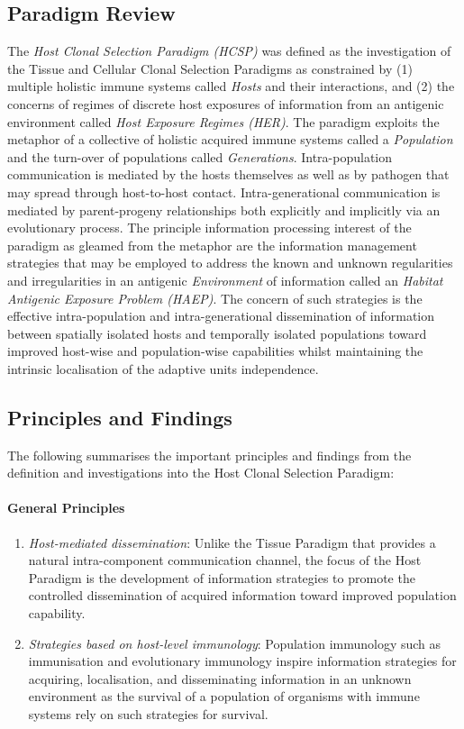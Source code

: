 \subsection{Paradigm Review}
The \emph{Host Clonal Selection Paradigm (HCSP)} was defined as the investigation of the Tissue and Cellular Clonal Selection Paradigms as constrained by (1) multiple holistic immune systems called \emph{Hosts} and their interactions, and (2) the concerns of regimes of discrete host exposures of information from an antigenic environment called \emph{Host Exposure Regimes (HER)}.
The paradigm exploits the metaphor of a collective of holistic acquired immune systems called a \emph{Population} and the turn-over of populations called \emph{Generations}. Intra-population communication is mediated by the hosts themselves as well as by pathogen that may spread through host-to-host contact. Intra-generational communication is mediated by parent-progeny relationships both explicitly and implicitly via an evolutionary process.
The principle information processing interest of the paradigm as gleamed from the metaphor are the information management strategies that may be employed to address the known and unknown regularities and irregularities in an antigenic \emph{Environment} of information called an \emph{Habitat Antigenic Exposure Problem (HAEP)}. The concern of such strategies is the effective intra-population and intra-generational dissemination of information between spatially isolated hosts and temporally isolated populations toward improved host-wise and population-wise capabilities whilst maintaining the intrinsic localisation of the adaptive units independence. 

%
%
\subsection{Principles and Findings}
The following summarises the important principles and findings from the definition and investigations into the Host Clonal Selection Paradigm:

\paragraph{General Principles}
		\begin{enumerate}
			\item \emph{Host-mediated dissemination}: Unlike the Tissue Paradigm that provides a natural intra-component communication channel, the focus of the Host Paradigm is the development of information strategies to promote the controlled dissemination of acquired information toward improved population capability.
			\item \emph{Strategies based on host-level immunology}: Population immunology such as immunisation and evolutionary immunology inspire information strategies for acquiring, localisation, and disseminating information in an unknown environment as the survival of a population of organisms with immune systems rely on such strategies for survival.
		\end{enumerate}


